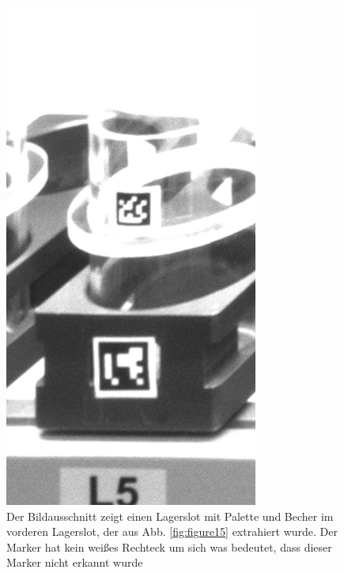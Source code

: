     \begin{figure}
        \caption[Bildzuschnitt einer Lagersektion und weitere Unterteilung in die Bereiche für Becher und Palette.]
        {\small Der Bildausschnitt zeigt einen Lagerslot mit Palette und Becher im vorderen Lagerslot, der aus Abb. \ref{fig:figure15} extrahiert wurde. Der Marker hat kein weißes Rechteck um sich was bedeutet, dass dieser Marker nicht erkannt wurde}\label{fig:figure18}
        \includegraphics[width = \textwidth/3]{Bilder/section_5.png}
        \centering
    \end{figure}

